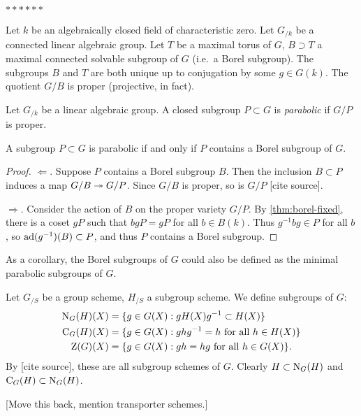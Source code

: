 $\ast\ast\ast\ast\ast\ast$

Let $k$ be an algebraically closed field of characteristic zero. Let $G_{/k}$ 
be a connected linear algebraic group. Let $T$ be a maximal torus of $G$, 
$B\supset T$ a maximal connected solvable subgroup of $G$ (i.e.~a Borel 
subgroup). The subgroups $B$ and $T$ are both unique up to conjugation by 
some $g\in G(k)$. The quotient $G/B$ is proper (projective, in fact). 

\begin{definition}
Let $G_{/k}$ be a linear algebraic group. A closed subgroup $P\subset G$ is 
\emph{parabolic} if $G/P$ is proper. 
\end{definition}

\begin{theorem}
A subgroup $P\subset G$ is parabolic if and only if $P$ contains a Borel 
subgroup of $G$. 
\end{theorem}
\begin{proof}
$\Leftarrow$. Suppose $P$ contains a Borel subgroup $B$. Then the inclusion 
$B\subset P$ induces a map $G/B\twoheadrightarrow G/P$. Since $G/B$ is proper, so is 
$G/P$ [cite source]. 

$\Rightarrow$. Consider the action of $B$ on the proper variety $G/P$. 
By \autoref{thm:borel-fixed}, there is a coset $g P$ such that 
$b g P= g P$ for all $b\in B(k)$. Thus $g^{-1} b g\in P$ for all $b$, so 
$\operatorname{ad}(g^{-1})(B)\subset P$, and thus $P$ contains a Borel subgroup. 
\end{proof}

As a corollary, the Borel subgroups of $G$ could also be defined as the 
minimal parabolic subgroups of $G$. 

Let $G_{/S}$ be a group scheme, $H_{/S}$ a subgroup scheme. We define 
subgroups of $G$: 
\begin{align*}
  \operatorname{N}_G(H)(X) &= \{g\in G(X):g H(X)g^{-1}\subset H(X)\} \\
  \operatorname{C}_G(H)(X) &= \{g\in G(X):g h g^{-1}= h\text{ for all }h\in H(X)\} \\
  \operatorname{Z}(G)(X) &= \{g\in G(X):g h=h g\text{ for all }h\in G(X)\} .
\end{align*}
By [cite source], these are all subgroup schemes of $G$. Clearly 
$H\subset \operatorname{N}_G(H)$ and $\operatorname{C}_G(H)\subset \operatorname{N}_G(H)$. 

[Move this back, mention transporter schemes.]

